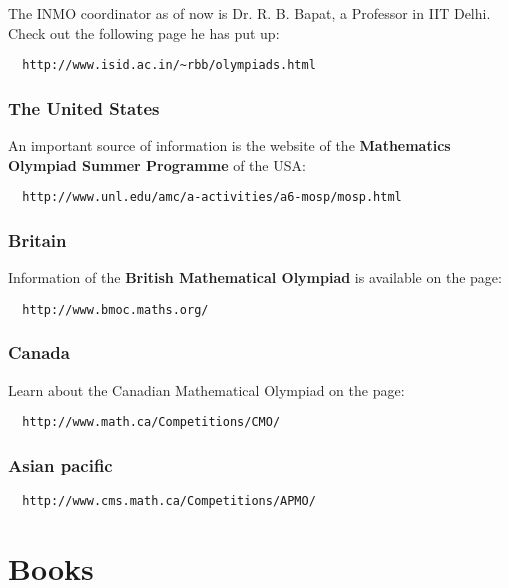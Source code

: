 \documentclass[a4paper]{amsart}
\begin{document}
The INMO coordinator as of now is Dr. R. B. Bapat, a Professor in IIT Delhi. Check out the following page he has put up:

\begin{verbatim}
  http://www.isid.ac.in/~rbb/olympiads.html
\end{verbatim}

\subsubsection{The United States}

An important source of information is the website of the
{\bf Mathematics Olympiad Summer Programme} of the USA:

\begin{verbatim}
  http://www.unl.edu/amc/a-activities/a6-mosp/mosp.html
\end{verbatim}

\subsubsection{Britain}

Information of the {\bf British Mathematical Olympiad} is available on the page:

\begin{verbatim}
  http://www.bmoc.maths.org/
\end{verbatim}

\subsubsection{Canada}

Learn about the Canadian Mathematical Olympiad on the page:

\begin{verbatim}
  http://www.math.ca/Competitions/CMO/
\end{verbatim}

\subsubsection{Asian pacific}

\begin{verbatim}
  http://www.cms.math.ca/Competitions/APMO/
\end{verbatim}

\section{Books}
\end{document}
